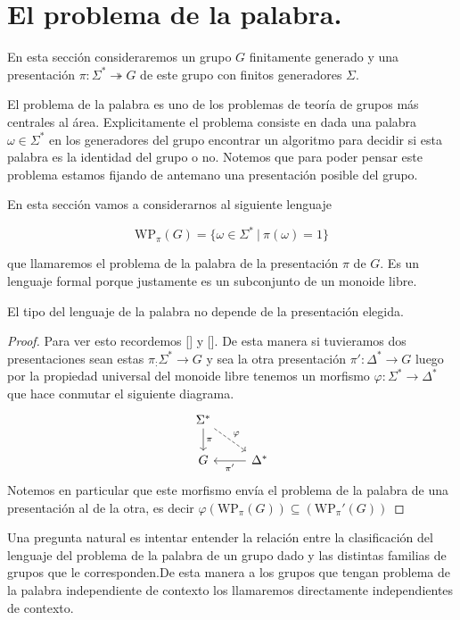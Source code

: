 \documentclass[tesis.tex]{subfiles}
\begin{document}
	
\chapter{El problema de la palabra.}
En esta sección consideraremos un grupo $G$ finitamente generado y una presentación $\pi: \Sigma^* \twoheadrightarrow  G$ de este grupo con finitos generadores $\Sigma$. 

El problema de la palabra es uno de los problemas de teoría de grupos más centrales al área. Explicitamente el problema consiste en dada una palabra $\omega \in \Sigma^*$ en los generadores del grupo encontrar un algoritmo para decidir si esta palabra es la identidad del grupo o no. Notemos que para poder pensar este problema estamos fijando de antemano una presentación posible del grupo.

En esta sección vamos a considerarnos al siguiente lenguaje 

$$\text{WP}_\pi (G) = \{ \omega \in \Sigma^* \ | \ \pi(\omega)=1 \}$$

que llamaremos el problema de la palabra de la presentación $\pi$ de $G$. Es un lenguaje formal porque justamente es un subconjunto de un monoide libre.

\begin{lema}
	El tipo del lenguaje de la palabra no depende de la presentación elegida.
\end{lema}
\begin{proof}
	Para ver esto recordemos [] y []. De esta manera si tuvieramos dos presentaciones sean estas
$\pi_:\Sigma^* \to G$ y sea la otra presentación $\pi': \Delta^* \to G$	luego por la propiedad universal del monoide libre tenemos un morfismo $\varphi:\Sigma^* \to \Delta^*$ que hace conmutar el siguiente diagrama. 
	\[
	\begin{tikzcd}
	\Sigma^*  \arrow{d}{\pi}  \arrow[dashrightarrow]{dr}{\varphi}   \\
	G     &  \Delta^* \arrow{l}{\pi'}
	\end{tikzcd}
	\]
Notemos en particular que este morfismo envía el problema de la palabra de una presentación al de la otra, es decir $\varphi(\text{WP}_\pi (G)) \subseteq (\text{WP}_\pi' (G))$
\end{proof}

Una pregunta natural es intentar entender la relación entre la clasificación del lenguaje del problema de la palabra de un grupo dado y las distintas familias de grupos que le corresponden.De esta manera a los grupos que tengan problema de la palabra independiente de contexto los llamaremos directamente independientes de contexto. 
\end{document}

